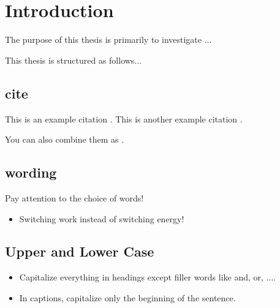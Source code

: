 \chapter{Introduction}
\label{cha:introduction}

The purpose of this thesis is primarily to investigate ...


This thesis is structured as follows...


\section{cite}

This is an example citation \cite{WaBo2016}. This is another example citation \cite{wallscheid2014real}.

You can also combine them as \cite{WaBo2016,wallscheid2014real}.


\section{wording}
Pay attention to the choice of words!
\begin{itemize}
	\item Switching work instead of switching energy!
\end{itemize}

\section{Upper and Lower Case}
\begin{itemize}
    \item Capitalize everything in headings except filler words like and, or, ....
    \item In captions, capitalize only the beginning of the sentence.
\end{itemize}


